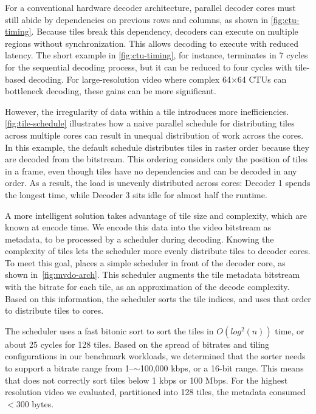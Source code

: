 For a conventional hardware decoder architecture, parallel decoder cores must still abide by dependencies on previous rows and columns, as shown in \ref{fig:ctu-timing}.
Because tiles break this dependency, decoders can execute on multiple regions without synchronization.
This allows decoding to execute with reduced latency.
The short example in \ref{fig:ctu-timing}, for instance, terminates in 7 cycles for the sequential decoding process, but it can be reduced to four cycles with tile-based decoding.
For large-resolution video where complex 64$\times$64 CTUs can bottleneck decoding, these gains can be more significant.

However, the irregularity of data within a tile introduces more inefficiencies.
\ref{fig:tile-schedule} illustrates how a naive parallel schedule for distributing tiles across multiple cores can result in unequal distribution of work across the cores.
In this example, the default schedule distributes tiles in raster order because they are decoded from the \hevc bitstream.
This ordering considers only the position of tiles in a frame, even though tiles have no dependencies and can be decoded in any order.
As a result, the load is unevenly distributed across cores: Decoder 1 spends the longest time, while Decoder 3 sits idle for almost half the runtime.

A more intelligent solution takes advantage of tile size and complexity, which are known at encode time.
We encode this data into the video bitstream as metadata, to be processed by a scheduler during decoding.
Knowing the complexity of tiles lets the scheduler more evenly distribute tiles to decoder cores.
To meet this goal, \nameArch places a simple scheduler in front of the decoder core, as shown in~\ref{fig:mvdo-arch}.
This scheduler augments the tile metadata bitstream with the bitrate for each tile, as an approximation of the decode complexity.
Based on this information, the scheduler sorts the tile indices, and uses that order to distribute tiles to cores.

\coresVsDecodeSpeedupFigure


The scheduler uses a fast bitonic sort to sort the tiles in $O(log^2(n))$ time, or about 25 cycles for 128 tiles.
Based on the spread of bitrates and tiling configurations in our benchmark workloads, we determined that the sorter needs to support a bitrate range from 1--$\sim$100,000 kbps, or a 16-bit range.
This means that \nameArch does not correctly sort tiles below 1 kbps or 100 Mbps.
For the highest resolution video we evaluated, partitioned into 128 tiles, the metadata consumed $<300$ bytes.

